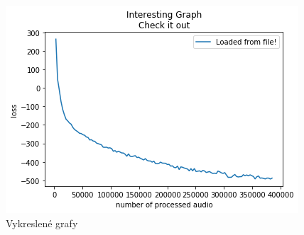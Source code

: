 





\begin{figure}[H]
    \centering
    \includegraphics[scale=0.55]{obrazky-figures/some-loss.png}
    \caption{\label{graf:somelossTODO}Vykreslené grafy}
\end{figure}

